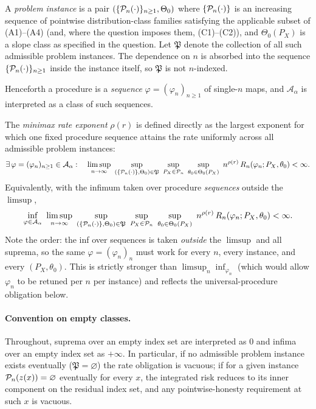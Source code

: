 \documentclass{article}
\begin{document}
A \emph{problem instance} is a pair \((\{\mathcal P_n(\cdot)\}_{n\ge1},\Theta_0)\)
where \(\{\mathcal P_n(\cdot)\}\) is an increasing sequence of pointwise
distribution-class families satisfying the applicable subset of
(A1)--(A4) (and, where the question imposes them, (C1)--(C2)), and
\(\Theta_0(P_X)\) is a slope class as specified in the question. Let
\(\mathfrak P\) denote the collection of all such admissible problem
instances. The dependence on \(n\) is absorbed into the sequence
\(\{\mathcal P_n(\cdot)\}_{n\ge1}\) inside the instance itself, so
\(\mathfrak P\) is not \(n\)-indexed.

Henceforth a procedure is a \emph{sequence}
\(\varphi=(\varphi_n)_{n\ge1}\) of single-\(n\) maps, and
\(\mathcal A_\alpha\) is interpreted as a class of such sequences.

The \emph{minimax rate exponent} \(\rho(r)\) is defined directly as the
largest exponent for which one fixed procedure sequence attains the rate
uniformly across all admissible problem instances:
\[
  \exists\,\varphi=(\varphi_n)_{n\ge1}\in\mathcal A_\alpha:\quad
  \limsup_{n\to\infty}\
  \sup_{(\{\mathcal P_n(\cdot)\},\Theta_0)\in\mathfrak P}\
  \sup_{P_X\in\mathcal P_n}\
  \sup_{\theta_0\in\Theta_0(P_X)}\
  n^{\rho(r)}\,
  R_n(\varphi_n;P_X,\theta_0)
  <
  \infty.
\]
Equivalently, with the infimum taken over procedure \emph{sequences}
outside the \(\limsup\),
\[
  \inf_{\varphi\in\mathcal A_\alpha}\
  \limsup_{n\to\infty}\
  \sup_{(\{\mathcal P_n(\cdot)\},\Theta_0)\in\mathfrak P}\
  \sup_{P_X\in\mathcal P_n}\
  \sup_{\theta_0\in\Theta_0(P_X)}\
  n^{\rho(r)}\,
  R_n(\varphi_n;P_X,\theta_0)
  <
  \infty.
\]
Note the order: the inf over sequences is taken \emph{outside} the
\(\limsup\) and all suprema, so the same \(\varphi=(\varphi_n)_n\) must
work for every \(n\), every instance, and every \((P_X,\theta_0)\). This
is strictly stronger than \(\limsup_n\inf_{\varphi_n}\) (which would
allow \(\varphi_n\) to be retuned per \(n\) per instance) and reflects
the universal-procedure obligation below.

\paragraph{Convention on empty classes.} Throughout, suprema over an
empty index set are interpreted as \(0\) and infima over an empty
index set as \(+\infty\). In particular, if no admissible problem
instance exists eventually (\(\mathfrak P=\varnothing\)) the rate
obligation is vacuous; if for a given instance \(\mathcal P_n(z(x))=\varnothing\)
eventually for every \(x\), the integrated risk reduces to its inner
component on the residual index set, and any pointwise-honesty
requirement at such \(x\) is vacuous.
\end{document}
